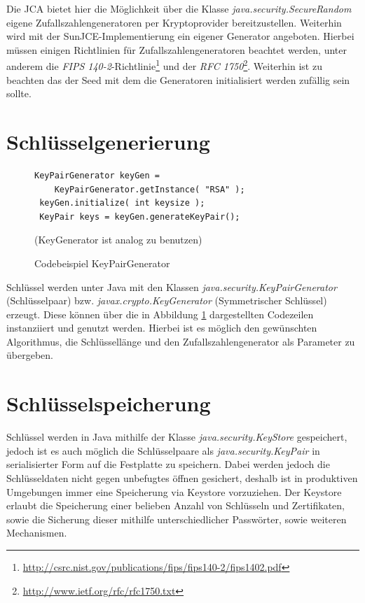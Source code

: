 \documentclass[11pt,a4paper]{scrreprt}
\begin{document}
Die JCA bietet hier die Möglichkeit über die Klasse \textit{java.security.SecureRandom} eigene Zufallszahlengeneratoren per Kryptoprovider bereitzustellen. Weiterhin wird mit der SunJCE-Implementierung ein eigener Generator angeboten. Hierbei müssen einigen Richtlinien für Zufallszahlengeneratoren beachtet werden, unter anderem die \textit{FIPS 140-2}-Richtlinie\footnote{\url{http://csrc.nist.gov/publications/fips/fips140-2/fips1402.pdf}} und der \textit{RFC 1750}\footnote{\url{http://www.ietf.org/rfc/rfc1750.txt}}. Weiterhin ist zu beachten das der Seed mit dem die Generatoren initialisiert werden zufällig sein sollte.

\section{Schlüsselgenerierung}

\begin{figure}[hbtp]
\caption{Codebeispiel KeyPairGenerator}
\begin{lstlisting}[frame=shadowbox]
 KeyPairGenerator keyGen = 
 	KeyPairGenerator.getInstance( "RSA" );
 keyGen.initialize( int keysize );
 KeyPair keys = keyGen.generateKeyPair();
\end{lstlisting}
(KeyGenerator ist analog zu benutzen)
\label{KeyPairGen}
\end{figure}

Schlüssel werden unter Java mit den Klassen \textit{java.security.KeyPairGenerator} (Schlüsselpaar) bzw. \textit{javax.crypto.KeyGenerator} (Symmetrischer Schlüssel) erzeugt. Diese können über die in Abbildung \ref{KeyPairGen} dargestellten Codezeilen instanziiert und genutzt werden. Hierbei ist es möglich den gewünschten Algorithmus, die Schlüssellänge und den Zufallszahlengenerator als Parameter zu übergeben.

\section{Schlüsselspeicherung}
Schlüssel werden in Java mithilfe der Klasse \textit{java.security.KeyStore} gespeichert, jedoch ist es auch möglich die Schlüsselpaare als \textit{java.security.KeyPair} in serialisierter Form auf die Festplatte zu speichern. Dabei werden jedoch die Schlüsseldaten nicht gegen unbefugtes öffnen gesichert, deshalb ist in produktiven Umgebungen immer eine Speicherung via Keystore vorzuziehen. Der Keystore erlaubt die Speicherung einer belieben Anzahl von Schlüsseln und Zertifikaten, sowie die Sicherung dieser mithilfe unterschiedlicher Passwörter, sowie weiteren Mechanismen.
\end{document}
